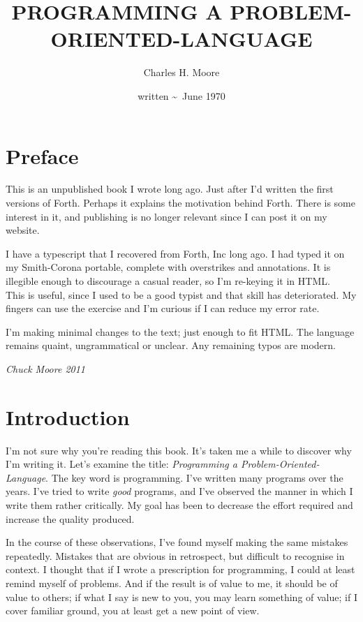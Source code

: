 \documentclass[b5paper, oneside]{book}
\title{PROGRAMMING A PROBLEM-ORIENTED-LANGUAGE}
\author{Charles H. Moore}
\date{written \textasciitilde\ June 1970}
\begin{document}

\frontmatter

\maketitle

\chapter*{Preface}

This is an unpublished book I wrote long ago. Just after I'd written the first versions of Forth. Perhaps it explains the motivation behind Forth. There is some interest in it, and publishing is no longer relevant since I can post it on my website.

I have a typescript that I recovered from Forth, Inc long ago. I had typed it on my Smith-Corona portable, complete with overstrikes and annotations. It is illegible enough to discourage a casual reader, so I'm re-keying it in HTML.
\\
This is useful, since I used to be a good typist and that skill has deteriorated. My fingers can use the exercise and I'm curious if I can reduce my error rate.

I'm making minimal changes to the text; just enough to fit HTML. The language remains quaint, ungrammatical or unclear. Any remaining typos are modern.

\textit{Chuck Moore 2011}

\tableofcontents

\mainmatter


\chapter{Introduction}
I'm not sure why you're reading this book. It's taken me a while to discover why I'm writing it. Let's examine the title: {\em Programming a Problem-Oriented-Language}. The key word is programming. I've written many programs over the years. I've tried to write {\em good} programs, and I've observed the manner in which I write them rather critically. My goal has been to decrease the effort required and increase the quality produced.

In the course of these observations, I've found myself making the same mistakes repeatedly. Mistakes that are obvious in retrospect, but difficult to recognise in context. I thought that if I wrote a prescription for programming, I could at least remind myself of problems. And if the result is of value to me, it should be of value to others; if what I say is new to you, you may learn something of value; if I cover familiar ground, you at least get a new point of view.
\end{document}
